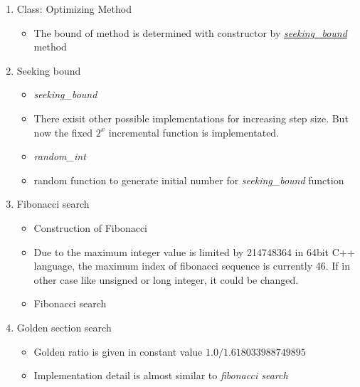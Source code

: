 \documentclass[12pt,letterpaper]{article}
\begin{document}
\begin{enumerate}
\setlength\itemsep{0.5em}{}
\item Class: Optimizing Method
\begin{itemize}
  \item The bound of method is determined with constructor by \hyperref[func:seek]{\emph{seeking\_bound}} method
\end{itemize}

\item Seeking bound

\begin{itemize}
  \item \label{func:seek} \emph{seeking\_bound}
  \item There exisit other possible implementations for increasing step size. 
  But now the fixed $2^x$ incremental function is implementated.
\end{itemize}

\newpage

\begin{itemize}
  \item \label{func:random} \emph{random\_int}
  \item random function to generate initial number for \emph{seeking\_bound} function  
\end{itemize}

\item Fibonacci search
\begin{itemize}
  \item Construction of Fibonacci
  \item Due to the maximum integer value is limited by 214748364 in 64bit C++ language, 
  the maximum index of fibonacci sequence is currently 46. 
  If in other case like unsigned or long integer, it could be changed.
\end{itemize}

\newpage

\begin{itemize}
  \item Fibonacci search
\end{itemize}

\item Golden section search
\begin{itemize}
  \item Golden ratio is given in constant value $1.0/1.618033988749895$
  \item Implementation detail is almost similar to \emph{fibonacci search}
\end{itemize}


\end{enumerate}
\end{document}
